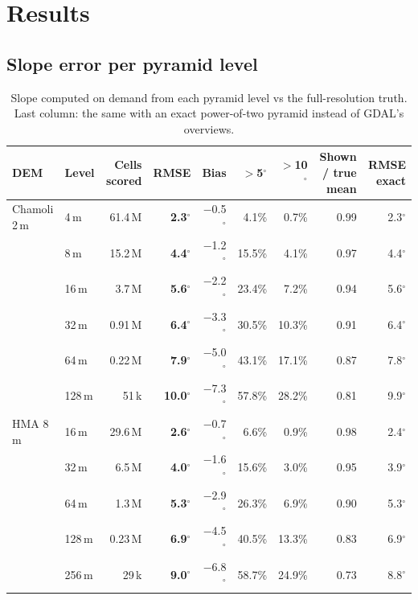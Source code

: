 ﻿\documentclass[11pt,a4paper]{article}
\begin{document}
\section{Results}
\subsection{Slope error per pyramid level}

\begin{table}[!htbp]
\centering\small
\caption{Slope computed on demand from each pyramid level vs the full-resolution truth. Last column: the same with
an exact power-of-two pyramid instead of GDAL's overviews.}
\label{tab:err}
\begin{tabularx}{\linewidth}{llRRRRRRR}
\toprule
DEM & Level & Cells scored & RMSE & Bias & $>$5$^\circ$ & $>$10$^\circ$ & Shown / true mean & RMSE exact \\
\midrule
Chamoli 2\,m & 4\,m & 61.4\,M & \textbf{2.3$^\circ$} & $-$0.5$^\circ$ & 4.1\% & 0.7\% & 0.99 & 2.3$^\circ$ \\
 & 8\,m & 15.2\,M & \textbf{4.4$^\circ$} & $-$1.2$^\circ$ & 15.5\% & 4.1\% & 0.97 & 4.4$^\circ$ \\
 & 16\,m & 3.7\,M & \textbf{5.6$^\circ$} & $-$2.2$^\circ$ & 23.4\% & 7.2\% & 0.94 & 5.6$^\circ$ \\
 & 32\,m & 0.91\,M & \textbf{6.4$^\circ$} & $-$3.3$^\circ$ & 30.5\% & 10.3\% & 0.91 & 6.4$^\circ$ \\
 & 64\,m & 0.22\,M & \textbf{7.9$^\circ$} & $-$5.0$^\circ$ & 43.1\% & 17.1\% & 0.87 & 7.8$^\circ$ \\
 & 128\,m & 51\,k & \textbf{10.0$^\circ$} & $-$7.3$^\circ$ & 57.8\% & 28.2\% & 0.81 & 9.9$^\circ$ \\
\midrule
HMA 8\,m & 16\,m & 29.6\,M & \textbf{2.6$^\circ$} & $-$0.7$^\circ$ & 6.6\% & 0.9\% & 0.98 & 2.4$^\circ$ \\
 & 32\,m & 6.5\,M & \textbf{4.0$^\circ$} & $-$1.6$^\circ$ & 15.6\% & 3.0\% & 0.95 & 3.9$^\circ$ \\
 & 64\,m & 1.3\,M & \textbf{5.3$^\circ$} & $-$2.9$^\circ$ & 26.3\% & 6.9\% & 0.90 & 5.3$^\circ$ \\
 & 128\,m & 0.23\,M & \textbf{6.9$^\circ$} & $-$4.5$^\circ$ & 40.5\% & 13.3\% & 0.83 & 6.9$^\circ$ \\
 & 256\,m & 29\,k & \textbf{9.0$^\circ$} & $-$6.8$^\circ$ & 58.7\% & 24.9\% & 0.73 & 8.8$^\circ$ \\
\bottomrule
\end{tabularx}
\end{table}
\end{document}
